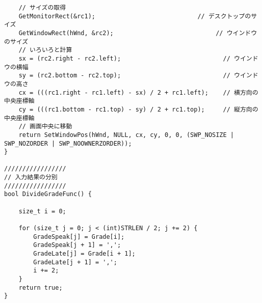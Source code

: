\begin{verbatim}
	// サイズの取得
	GetMonitorRect(&rc1);                            // デスクトップのサイズ
	GetWindowRect(hWnd, &rc2);                            // ウインドウのサイズ
	// いろいろと計算
	sx = (rc2.right - rc2.left);                            // ウインドウの横幅
	sy = (rc2.bottom - rc2.top);                            // ウインドウの高さ
	cx = (((rc1.right - rc1.left) - sx) / 2 + rc1.left);    // 横方向の中央座標軸
	cy = (((rc1.bottom - rc1.top) - sy) / 2 + rc1.top);     // 縦方向の中央座標軸
	// 画面中央に移動
	return SetWindowPos(hWnd, NULL, cx, cy, 0, 0, (SWP_NOSIZE | SWP_NOZORDER | SWP_NOOWNERZORDER));
}

/////////////////
// 入力結果の分別
/////////////////
bool DivideGradeFunc() {

	size_t i = 0;

	for (size_t j = 0; j < (int)STRLEN / 2; j += 2) {
		GradeSpeak[j] = Grade[i];
		GradeSpeak[j + 1] = ',';
		GradeLate[j] = Grade[i + 1];
		GradeLate[j + 1] = ',';
		i += 2;
	}
	return true;
}

\end{verbatim}